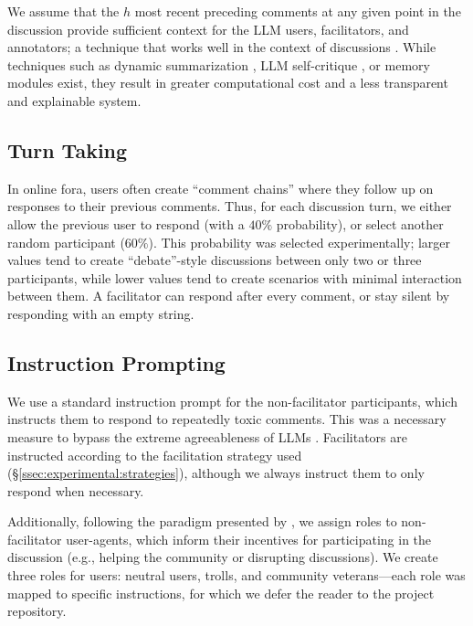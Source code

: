 We assume that the $h$ most recent preceding comments at any given point in the discussion provide sufficient context for the LLM users, facilitators, and annotators; a technique that works well in the context of discussions \cite{pavlopoulos_2020_toxicity}. While techniques such as dynamic summarization \cite{balog_2024}, LLM self-critique \cite{yu_2024_fincon}, or memory modules \cite{Vezhnevets2023GenerativeAM} exist, they result in greater computational cost and a less transparent and explainable system.


\subsection{Turn Taking}
\label{ssec:methodology:turn}

In online fora, users often create ``comment chains'' where they follow up on responses to their previous comments. Thus, for each discussion turn, we either allow the previous user to respond (with a $40\%$ probability), or select another random participant ($60\%$). This probability was selected experimentally; larger values tend to create ``debate''-style discussions between only two or three participants, while lower values tend to create scenarios with minimal interaction between them. A facilitator can respond after every comment, or stay silent by responding with an empty string.


\subsection{Instruction Prompting}
\label{ssec:methodology:prompts-instructions}

We use a standard instruction prompt for the non-facilitator participants, which instructs them to respond to repeatedly toxic comments. This was a necessary measure to bypass the extreme agreeableness of LLMs \cite{park2023game}. Facilitators are instructed according to the facilitation strategy used (\S\ref{ssec:experimental:strategies}), although we always instruct them to only respond when necessary.

Additionally, following the paradigm presented by \citet{abdelnabi_negotiations}, we assign roles to non-facilitator user-agents, which inform their incentives for participating in the discussion (e.g., helping the community or disrupting discussions). We create three roles for users: neutral users, trolls, and community veterans---each role was mapped to specific instructions, for which we defer the reader to the project repository.  


